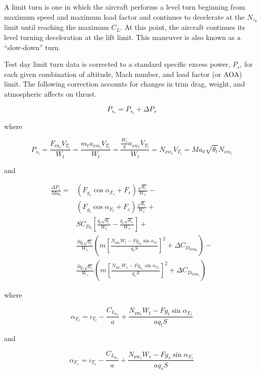 \documentclass[
]{book}
\begin{document}
A limit turn is one in which the aircraft performs a level turn beginning from
maximum speed and maximum load factor and continues to decelerate at the
\(N_{z_b}\) limit until reaching the maximum \(C_L\). At this point, the
aircraft continues its level turning deceleration at the lift limit. This
maneuver is also known as a ``slow-down'' turn.

Test day limit turn data is corrected to a standard specific excess power,
\(P_s\), for each given combination of altitude, Mach number, and load factor
(or AOA) limit. The following correction accounts for changes in trim drag,
weight, and atmospheric affects on thrust.

\[
P_{s_s} = P_{s_t} + \Delta P_s
\label{eq:std-p-sub-s}
\]

where

\[
P_{s_t} = 
\frac{F_{\text{ex}_t} V_{T_t}}{W_t} = 
\frac{m_t a_{xw_t} V_{T_t}}{W_t} =
\frac{\frac{W_t}{g} a_{xw_t} V_{T_t}}{W_t} = 
N_{xw_t} V_{T_t} =
M a_0 \sqrt{\theta_t} N_{xw_t}
\]

and

\begin{align}
\frac{\Delta P_s}{M a_0} =
      &\left(
            F_{g_s} \cos \alpha_{F_s} + F_e
      \right) \frac{\sqrt{\theta_s}}{W_s} - \\
      &\left(
            F_{g_t} \cos \alpha_{F_t} + F_e
      \right) \frac{\sqrt{\theta_t}}{W_t} + \\
      &SC_{D_0} \left[
                     \frac{q_t \sqrt{\theta_t}}{W_t} -
                     \frac{q_s \sqrt{\theta_s}}{W_s}
               \right] + \\
      &\frac{S q_t \sqrt{\theta_t}}{W_t} 
      \left(
            m \left[
                  \frac{N_{\text{zw}_t} W_t - Fg_{n_t} \sin \alpha_{F_t}}{q_t S}
            \right]^2 +
            \Delta C_{D_{\text{trim}_t}}
      \right) - \\
      &\frac{S q_s \sqrt{\theta_s}}{W_s} 
      \left(
            m \left[
                  \frac{N_{\text{zw}_s} W_s - Fg_{n_s} \sin \alpha_{F_s}}{q_s S}
            \right]^2 +
            \Delta C_{D_{\text{trim}_s}}
      \right)
\end{align}

where

\[
\alpha_{F_t} = \iota_{T_t} - \frac{C_{L_{0_\alpha}}}{a} + \frac{N_{\text{zw}_t} W_t - F{g_t} \sin \alpha_{F_t}}{a q_t S}
\]

and

\[
\alpha_{F_s} = \iota_{T_s} - \frac{C_{L_{0_\alpha}}}{a} + \frac{N_{\text{zw}_s} W_s - F{g_s} \sin \alpha_{F_s}}{a q_s S}
\]
\end{document}
